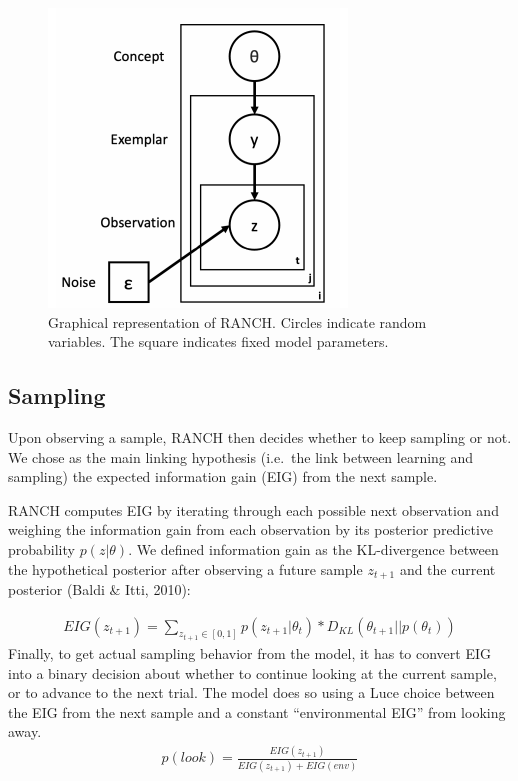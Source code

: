 \documentclass[10pt, letterpaper]{article}
\newenvironment{CodeChunk}{}{}
\begin{document}
\begin{CodeChunk}
\begin{figure}[H]

{\centering \includegraphics{figs/plate_diagram-1} 

}

\caption[Graphical representation of RANCH]{Graphical representation of RANCH. Circles indicate random variables. The square indicates fixed model parameters.}\label{fig:plate_diagram}
\end{figure}
\end{CodeChunk}

\hypertarget{sampling}{%
\subsection{Sampling}\label{sampling}}

Upon observing a sample, RANCH then decides whether to keep sampling or
not. We chose as the main linking hypothesis (i.e.~the link between
learning and sampling) the expected information gain (EIG) from the next
sample.

RANCH computes EIG by iterating through each possible next observation
and weighing the information gain from each observation by its posterior
predictive probability \(p(z|\theta)\). We defined information gain as
the KL-divergence between the hypothetical posterior after observing a
future sample \(z_{t+1}\) and the current posterior (Baldi \& Itti,
2010):

\begin{eqnarray}
EIG(z_{t+1}) = \sum_{z_{t+1} \in [0,1]} p(z_{t+1}|\theta_t) * D_{KL}(\theta_{t+1} || p(\theta_t))
\end{eqnarray} Finally, to get actual sampling behavior from the model,
it has to convert EIG into a binary decision about whether to continue
looking at the current sample, or to advance to the next trial. The
model does so using a Luce choice between the EIG from the next sample
and a constant ``environmental EIG'' from looking away. \begin{eqnarray}
p(look) = \frac{EIG(z_{t+1})}{EIG(z_{t+1})+EIG(env)}
\end{eqnarray}
\end{document}
